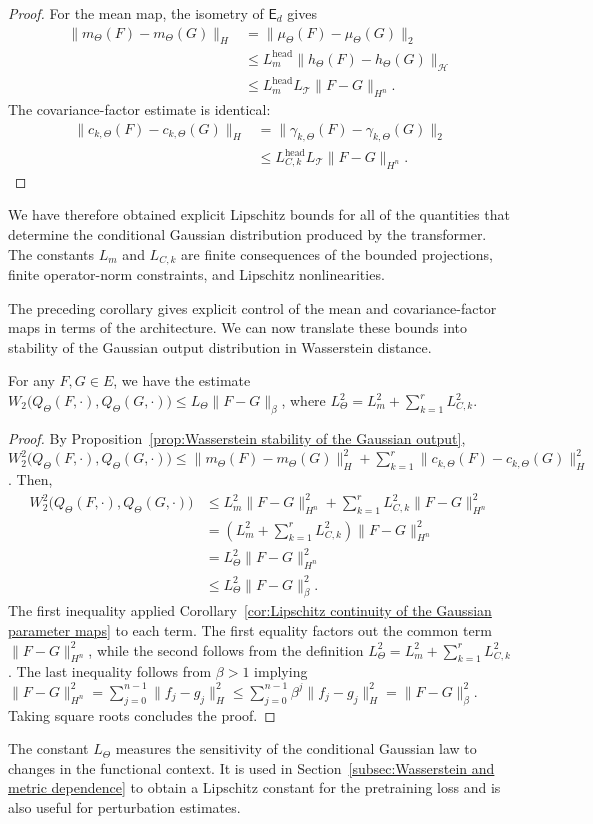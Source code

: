\begin{proof}
For the mean map, the isometry of \(\mathsf E_d\) gives
\[
\begin{aligned}
\|m_\Theta(F)-m_\Theta(G)\|_H
&=\|\mu_\Theta(F)-\mu_\Theta(G)\|_2\\
&\leqslant L_m^{\mathrm{head}}\|h_\Theta(F)-h_\Theta(G)\|_{\mathcal H}\\
&\leqslant L_m^{\mathrm{head}}L_{\mathcal T}\|F-G\|_{H^n}.
\end{aligned}
\]
The covariance-factor estimate is identical:
\[
\begin{aligned}
\|c_{k,\Theta}(F)-c_{k,\Theta}(G)\|_H
&=\|\gamma_{k,\Theta}(F)-\gamma_{k,\Theta}(G)\|_2\\
&\leqslant L_{C,k}^{\mathrm{head}}L_{\mathcal T}\|F-G\|_{H^n}.
\end{aligned}
\]
\end{proof}

We have therefore obtained explicit Lipschitz bounds for all of the quantities that determine the conditional Gaussian distribution produced by the transformer. The constants \(L_m\) and \(L_{C,k}\) are finite consequences of the bounded projections, finite operator-norm constraints, and Lipschitz nonlinearities.

The preceding corollary gives explicit control of the mean and covariance-factor maps in terms of the architecture. We can now translate these bounds into stability of the Gaussian output distribution in Wasserstein distance.

\begin{proposition}
\label{prop:Lipschitz continuity of the Gaussian output kernel}
For any \(F,G\in E\), we have the estimate \( W_2\bigl(Q_\Theta(F,\cdot),Q_\Theta(G,\cdot)\bigr)\leqslant L_\Theta\|F-G\|_\beta\), where \(L_\Theta^2=L_m^2+\sum_{k=1}^rL_{C,k}^2\).
\end{proposition}

\begin{proof}
By Proposition~\ref{prop:Wasserstein stability of the Gaussian output}, \(W_2^2\bigl(Q_\Theta(F,\cdot),Q_\Theta(G,\cdot)\bigr)\leqslant
\|m_\Theta(F)-m_\Theta(G)\|_H^2+\sum_{k=1}^r
\|c_{k,\Theta}(F)-c_{k,\Theta}(G)\|_H^2
\). Then,
\[
\begin{aligned}
W_2^2\bigl(Q_\Theta(F,\cdot),Q_\Theta(G,\cdot)\bigr)
&\leqslant
L_m^2\|F-G\|_{H^n}^2
+
\sum_{k=1}^r
L_{C,k}^2\|F-G\|_{H^n}^2\\
&=
\left(
L_m^2+\sum_{k=1}^rL_{C,k}^2
\right)
\|F-G\|_{H^n}^2\\
&=
L_\Theta^2\|F-G\|_{H^n}^2\\
&\leqslant
L_\Theta^2\|F-G\|_{\beta}^2.
\end{aligned}
\]
The first inequality applied Corollary~\ref{cor:Lipschitz continuity of the Gaussian parameter maps} to each term. The first equality factors out the common term \(\|F-G\|_{H^n}^2\), while the second follows from the definition \(L_\Theta^2=L_m^2+\sum_{k=1}^rL_{C,k}^2\). The last inequality follows from \(\beta>1\) implying \(\|F-G\|_{H^n}^2
=
\sum_{j=0}^{n-1}\|f_j-g_j\|_H^2
\leqslant
\sum_{j=0}^{n-1}\beta^j\|f_j-g_j\|_H^2
=
\|F-G\|_\beta^2.
\)
Taking square roots concludes the proof.
\end{proof}

The constant \(L_\Theta\) measures the sensitivity of the conditional Gaussian law to changes in the functional context. It is used in Section~\ref{subsec:Wasserstein and metric dependence} to obtain a Lipschitz constant for the pretraining loss and is also useful for perturbation estimates.

